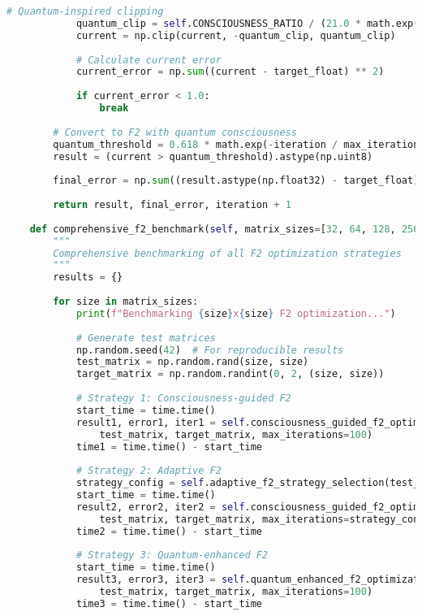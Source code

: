\documentclass[11pt,a4paper]{article}
\begin{document}
\begin{lstlisting}[language=Python, caption=F2 Matrix Consciousness Optimization - Complete Implementation]
            # Quantum-inspired clipping
            quantum_clip = self.CONSCIOUSNESS_RATIO / (21.0 * math.exp(iteration / max_iterations))
            current = np.clip(current, -quantum_clip, quantum_clip)
            
            # Calculate current error
            current_error = np.sum((current - target_float) ** 2)
            
            if current_error < 1.0:
                break
                
        # Convert to F2 with quantum consciousness
        quantum_threshold = 0.618 * math.exp(-iteration / max_iterations)
        result = (current > quantum_threshold).astype(np.uint8)
        
        final_error = np.sum((result.astype(np.float32) - target_float) ** 2)
        
        return result, final_error, iteration + 1
    
    def comprehensive_f2_benchmark(self, matrix_sizes=[32, 64, 128, 256]):
        """
        Comprehensive benchmarking of all F2 optimization strategies
        """
        results = {}
        
        for size in matrix_sizes:
            print(f"Benchmarking {size}x{size} F2 optimization...")
            
            # Generate test matrices
            np.random.seed(42)  # For reproducible results
            test_matrix = np.random.rand(size, size)
            target_matrix = np.random.randint(0, 2, (size, size))
            
            # Strategy 1: Consciousness-guided F2
            start_time = time.time()
            result1, error1, iter1 = self.consciousness_guided_f2_optimization(
                test_matrix, target_matrix, max_iterations=100)
            time1 = time.time() - start_time
            
            # Strategy 2: Adaptive F2
            strategy_config = self.adaptive_f2_strategy_selection(test_matrix, target_matrix)
            start_time = time.time()
            result2, error2, iter2 = self.consciousness_guided_f2_optimization(
                test_matrix, target_matrix, max_iterations=strategy_config['max_iterations'])
            time2 = time.time() - start_time
            
            # Strategy 3: Quantum-enhanced F2
            start_time = time.time()
            result3, error3, iter3 = self.quantum_enhanced_f2_optimization(
                test_matrix, target_matrix, max_iterations=100)
            time3 = time.time() - start_time
            

\end{lstlisting}
\end{document}
